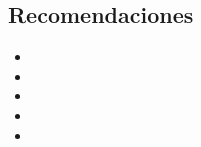 \subsection{Recomendaciones}

\begin{itemize}
    \item \lipsum[1]
    \item \lipsum[2]
    \item \lipsum[3]
    \item \lipsum[4]
    \item \lipsum[5]
\end{itemize}